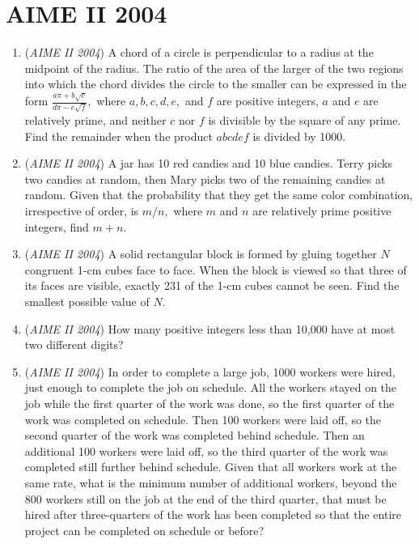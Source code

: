 \section{AIME II 2004}
        \begin{enumerate}
        	\item (\textit{AIME II 2004}) A chord of a circle is perpendicular to a radius at the midpoint of the radius. The ratio of the area of the larger of the two regions into which the chord divides the circle to the smaller can be expressed in the form $\frac{a\pi+b\sqrt{c}}{d\pi-e\sqrt{f}},$ where $a, b, c, d, e,$ and $f$ are positive integers, $a$ and $e$ are relatively prime, and neither $c$ nor $f$ is divisible by the square of any prime. Find the remainder when the product $abcdef$ is divided by 1000.


 

	\item (\textit{AIME II 2004}) A jar has 10 red candies and 10 blue candies. Terry picks two candies at random, then Mary picks two of the remaining candies at random. Given that the probability that they get the same color combination, irrespective of order, is $m/n,$ where $m$ and $n$ are relatively prime positive integers, find $m+n.$


	\item (\textit{AIME II 2004}) A solid rectangular block is formed by gluing together $N$ congruent 1-cm cubes face to face. When the block is viewed so that three of its faces are visible, exactly 231 of the 1-cm cubes cannot be seen. Find the smallest possible value of $N.$


	\item (\textit{AIME II 2004}) How many positive integers less than 10,000 have at most two different digits?


 

	\item (\textit{AIME II 2004}) In order to complete a large job, 1000 workers were hired, just enough to complete the job on schedule. All the workers stayed on the job while the first quarter of the work was done, so the first quarter of the work was completed on schedule. Then 100 workers were laid off, so the second quarter of the work was completed behind schedule. Then an additional 100 workers were laid off, so the third quarter of the work was completed still further behind schedule. Given that all workers work at the same rate, what is the minimum number of additional workers, beyond the 800 workers still on the job at the end of the third quarter, that must be hired after three-quarters of the work has been completed so that the entire project can be completed on schedule or before?



\end{enumerate}

